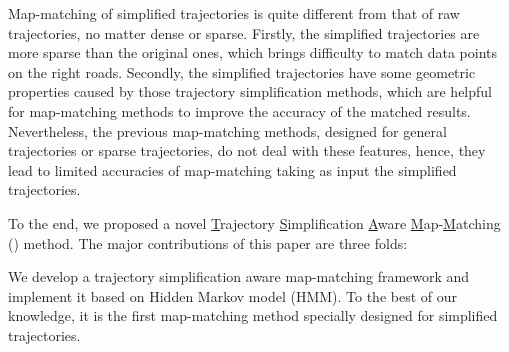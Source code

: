 
Map-matching of simplified trajectories is quite different from that of raw trajectories, no matter dense or sparse.
Firstly, the simplified trajectories are more sparse than the original ones, which brings difficulty to match data points on the right roads.
Secondly, the simplified trajectories have some geometric properties caused by those trajectory simplification methods,
which are helpful for map-matching methods to improve the accuracy of the matched results.
Nevertheless, the previous map-matching methods, designed for general
trajectories or sparse trajectories, do not deal with these features, hence, they lead to limited accuracies of map-matching taking as input the simplified trajectories.



To the end, we proposed a novel \underline{T}rajectory \underline{S}implification \underline{A}ware \underline{M}ap-\underline{M}atching (\stmm) method.
The major contributions of this paper are three folds:

 We develop a trajectory simplification aware map-matching framework and implement it based on Hidden Markov model (HMM). To the best of our knowledge, it is the first map-matching method specially designed for simplified trajectories.

 

